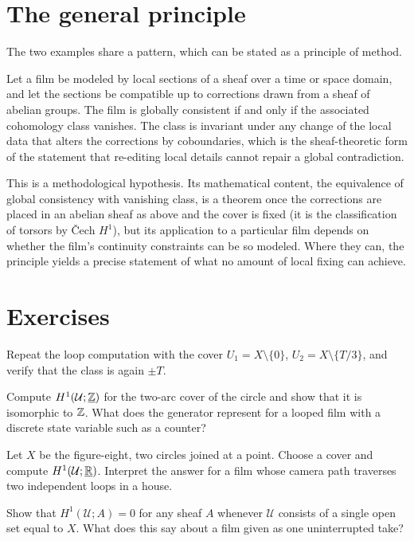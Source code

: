 \section{The general principle}

The two examples share a pattern, which can be stated as a principle of method.

\begin{principle}\label{pr:obstruction}
Let a film be modeled by local sections of a sheaf over a time or space domain, and let the sections be compatible up to corrections drawn from a sheaf of abelian groups. The film is globally consistent if and only if the associated cohomology class vanishes. The class is invariant under any change of the local data that alters the corrections by coboundaries, which is the sheaf-theoretic form of the statement that re-editing local details cannot repair a global contradiction.
\end{principle}

This is a methodological hypothesis. Its mathematical content, the equivalence of global consistency with vanishing class, is a theorem once the corrections are placed in an abelian sheaf as above and the cover is fixed (it is the classification of torsors by \v{C}ech $H^1$), but its application to a particular film depends on whether the film's continuity constraints can be so modeled. Where they can, the principle yields a precise statement of what no amount of local fixing can achieve.

\section*{Exercises}

\begin{exercise}
Repeat the loop computation with the cover $U_1=X\setminus\{0\}$, $U_2=X\setminus\{T/3\}$, and verify that the class is again $\pm T$.
\end{exercise}

\begin{exercise}
Compute $H^1(\mathcal{U};\underline{\mathbb{Z}})$ for the two-arc cover of the circle and show that it is isomorphic to $\mathbb{Z}$. What does the generator represent for a looped film with a discrete state variable such as a counter?
\end{exercise}

\begin{exercise}
Let $X$ be the figure-eight, two circles joined at a point. Choose a cover and compute $H^1(\mathcal{U};\underline{\mathbb{R}})$. Interpret the answer for a film whose camera path traverses two independent loops in a house.
\end{exercise}

\begin{exercise}
Show that $H^1(\mathcal{U};A)=0$ for any sheaf $A$ whenever $\mathcal{U}$ consists of a single open set equal to $X$. What does this say about a film given as one uninterrupted take?
\end{exercise}
